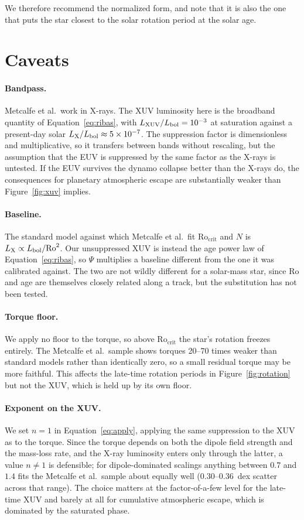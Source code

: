 \documentclass[11pt]{article}
\newcommand{\Rocrit}{\mathrm{Ro_{crit}}}
\begin{document}
We therefore recommend the normalized form, and note that it is also the one
that puts the star closest to the solar rotation period at the solar age.

\section{Caveats}
\label{sec:caveats}

\paragraph{Bandpass.} Metcalfe et al.\ work in X-rays. The XUV luminosity here
is the broadband quantity of Equation~\ref{eq:ribas}, with
$L_{\rm XUV}/L_{\rm bol} = 10^{-3}$ at saturation against a present-day solar
$L_{\rm X}/L_{\rm bol} \approx 5\times10^{-7}$. The suppression factor is
dimensionless and multiplicative, so it transfers between bands without
rescaling, but the assumption that the EUV is suppressed by the same factor as
the X-rays is untested. If the EUV survives the dynamo collapse better than the
X-rays do, the consequences for planetary atmospheric escape are substantially
weaker than Figure~\ref{fig:xuv} implies.

\paragraph{Baseline.} The standard model against which Metcalfe et al.\ fit
$\Rocrit$ and $N$ is $L_{\rm X} \propto L_{\rm bol}/\mathrm{Ro}^{2}$. Our
unsuppressed XUV is instead the age power law of Equation~\ref{eq:ribas}, so
$\Psi$ multiplies a baseline different from the one it was calibrated against.
The two are not wildly different for a solar-mass star, since Ro and age are
themselves closely related along a track, but the substitution has not been
tested.

\paragraph{Torque floor.} We apply no floor to the torque, so above $\Rocrit$
the star's rotation freezes entirely. The Metcalfe et al.\ sample shows torques
20--70 times weaker than standard models rather than identically zero, so a
small residual torque may be more faithful. This affects the late-time rotation
periods in Figure~\ref{fig:rotation} but not the XUV, which is held up by its
own floor.

\paragraph{Exponent on the XUV.} We set $n = 1$ in
Equation~\ref{eq:apply}, applying the same suppression to the XUV as to the
torque. Since the torque depends on both the dipole field strength and the
mass-loss rate, and the X-ray luminosity enters only through the latter, a
value $n \ne 1$ is defensible; for dipole-dominated scalings anything between
$0.7$ and $1.4$ fits the Metcalfe et al.\ sample about equally well
($0.30$--$0.36$~dex scatter across that range). The choice matters at the
factor-of-a-few level for the late-time XUV and barely at all for cumulative
atmospheric escape, which is dominated by the saturated phase.
\end{document}
